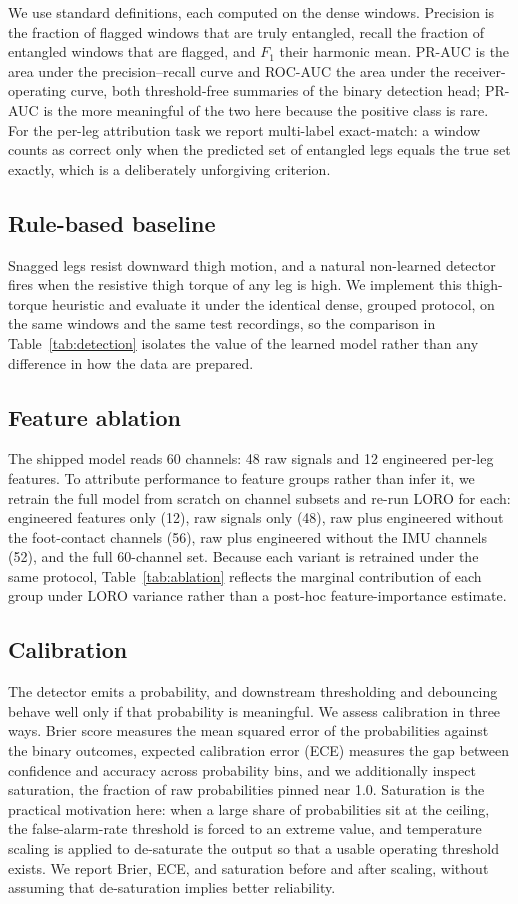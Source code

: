 We use standard definitions, each computed on the dense windows. Precision is the fraction of flagged windows that are truly entangled, recall the fraction of entangled windows that are flagged, and $F_1$ their harmonic mean. PR-AUC is the area under the precision--recall curve and ROC-AUC the area under the receiver-operating curve, both threshold-free summaries of the binary detection head; PR-AUC is the more meaningful of the two here because the positive class is rare. For the per-leg attribution task we report multi-label exact-match: a window counts as correct only when the predicted set of entangled legs equals the true set exactly, which is a deliberately unforgiving criterion.

\subsection{Rule-based baseline}
Snagged legs resist downward thigh motion, and a natural non-learned detector fires when the resistive thigh torque of any leg is high. We implement this thigh-torque heuristic and evaluate it under the identical dense, grouped protocol, on the same windows and the same test recordings, so the comparison in Table~\ref{tab:detection} isolates the value of the learned model rather than any difference in how the data are prepared.

\subsection{Feature ablation}
The shipped model reads 60 channels: 48 raw signals and 12 engineered per-leg features. To attribute performance to feature groups rather than infer it, we retrain the full model from scratch on channel subsets and re-run LORO for each: engineered features only (12), raw signals only (48), raw plus engineered without the foot-contact channels (56), raw plus engineered without the IMU channels (52), and the full 60-channel set. Because each variant is retrained under the same protocol, Table~\ref{tab:ablation} reflects the marginal contribution of each group under LORO variance rather than a post-hoc feature-importance estimate.

\subsection{Calibration}
The detector emits a probability, and downstream thresholding and debouncing behave well only if that probability is meaningful. We assess calibration in three ways. Brier score measures the mean squared error of the probabilities against the binary outcomes, expected calibration error (ECE) measures the gap between confidence and accuracy across probability bins, and we additionally inspect saturation, the fraction of raw probabilities pinned near 1.0. Saturation is the practical motivation here: when a large share of probabilities sit at the ceiling, the false-alarm-rate threshold is forced to an extreme value, and temperature scaling \cite{guo2017calibration,niculescu2005predicting} is applied to de-saturate the output so that a usable operating threshold exists. We report Brier, ECE, and saturation before and after scaling, without assuming that de-saturation implies better reliability.

